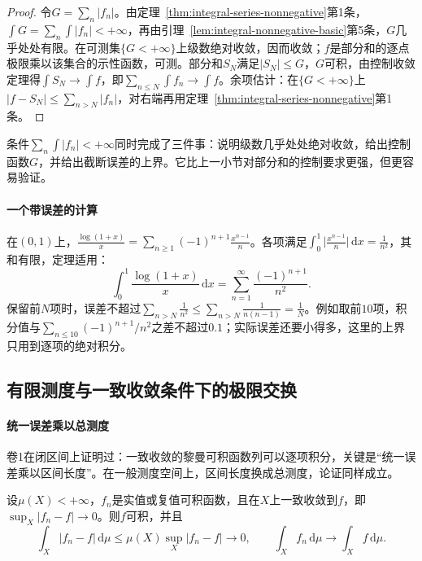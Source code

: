 \begin{proof}
令$G=\sum_n|f_n|$。由定理~\ref{thm:integral-series-nonnegative}第1条，$\int G=\sum_n\int|f_n|<+\infty$，再由引理~\ref{lem:integral-nonnegative-basic}第5条，$G$几乎处处有限。在可测集$\{G<+\infty\}$上级数绝对收敛，因而收敛；$f$是部分和的逐点极限乘以该集合的示性函数，可测。部分和$S_N$满足$|S_N|\le G$，$G$可积，由控制收敛定理得$\int S_N\to\int f$，即$\sum_{n\le N}\int f_n\to\int f$。余项估计：在$\{G<+\infty\}$上$|f-S_N|\le\sum_{n>N}|f_n|$，对右端再用定理~\ref{thm:integral-series-nonnegative}第1条。
\end{proof}

条件$\sum_n\int|f_n|<+\infty$同时完成了三件事：说明级数几乎处处绝对收敛，给出控制函数$G$，并给出截断误差的上界。它比上一小节对部分和的控制要求更强，但更容易验证。

\paragraph{一个带误差的计算}
在$(0,1)$上，$\frac{\log(1+x)}x=\sum_{n\ge1}(-1)^{n+1}\frac{x^{n-1}}n$。各项满足$\int_0^1\bigl|\frac{x^{n-1}}n\bigr|\,\mathrm dx=\frac1{n^2}$，其和有限，定理适用：
\[
 \int_0^1\frac{\log(1+x)}x\,\mathrm dx=\sum_{n=1}^\infty\frac{(-1)^{n+1}}{n^2}.
\]
保留前$N$项时，误差不超过$\sum_{n>N}\frac1{n^2}\le\sum_{n>N}\frac1{n(n-1)}=\frac1N$。例如取前$10$项，积分值与$\sum_{n\le10}(-1)^{n+1}/n^2$之差不超过$0.1$；实际误差还要小得多，这里的上界只用到逐项的绝对积分。

\subsection{有限测度与一致收敛条件下的极限交换}
\label{sec:integral-limits-uniform}

\paragraph{统一误差乘以总测度}
卷1在闭区间上证明过：一致收敛的黎曼可积函数列可以逐项积分，关键是“统一误差乘以区间长度”。在一般测度空间上，区间长度换成总测度，论证同样成立。

\begin{theorem}[有限测度上的一致收敛]
\label{thm:integral-uniform-finite}
设$\mu(X)<+\infty$，$f_n$是实值或复值可积函数，且在$X$上一致收敛到$f$，即$\sup_X|f_n-f|\to0$。则$f$可积，并且
\[
 \int_X|f_n-f|\,\mathrm d\mu\le\mu(X)\sup_X|f_n-f|\to0,\qquad\int_Xf_n\,\mathrm d\mu\to\int_Xf\,\mathrm d\mu.
\]
\end{theorem}

